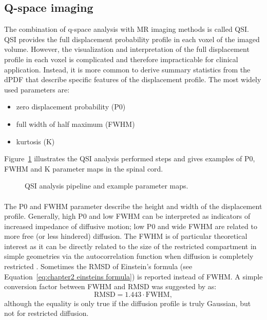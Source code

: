 \subsection{Q-space imaging}
\label{sec:qspace}
The combination of q-space analysis with MR imaging methods is called \gls{QSI}\citep{Callaghan:1991,Assaf:2000}. \Gls{QSI} provides the full displacement probability profile in each voxel of the imaged volume. However, the visualization and interpretation of the full displacement profile in each voxel is complicated and therefore impracticable for clinical application. Instead, it is more common to derive summary statistics from the \gls{dPDF} that describe specific features of the displacement profile. The most widely used parameters are: 
\begin{itemize}
\item zero displacement probability (P0)
\item full width of half maximum (FWHM)
\item kurtosis (K)
\end{itemize}
Figure~\ref{fig:chapter 2 QSI analysis} illustrates the QSI analysis performed steps and gives examples of P0, FWHM and K parameter maps in the spinal cord.
\begin{figure}[htbp]
 \centering
 \caption{QSI analysis pipeline and example parameter maps.}
 \label{fig:chapter 2 QSI analysis}
\end{figure}
\paragraph{}
The P0 and FWHM parameter describe the height and width of the displacement profile. Generally, high P0 and low FWHM can be interpreted as indicators of increased impedance of diffusive motion; low P0 and wide FWHM are related to more free (or less hindered) diffusion. The FWHM is of particular theoretical interest as it can be directly related to the size of the restricted compartment in simple geometries via the autocorrelation function when diffusion is completely restricted \citep{Cory:1990,Kuchel:1997}. Sometimes the \gls{RMSD} of Einstein's formula (see Equation~\ref{eq:chapter2 einsteins formula}) is reported instead of FWHM. A simple conversion factor between FWHM and RMSD was suggested by \citet{Cory:1990} as:
\begin{equation}
	\mbox{RMSD} = 1.443 \cdot \mbox{FWHM},
\end{equation}
although the equality is only true if the diffusion profile is truly Gaussian, but not for restricted diffusion.

